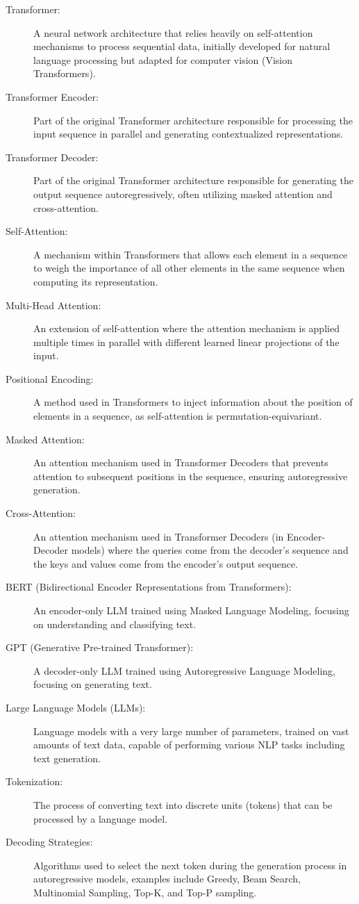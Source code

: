 \begin{description}
  \item[Transformer:] A neural network architecture that relies heavily on self-attention mechanisms to process sequential data, initially developed for natural language processing but adapted for computer vision (Vision Transformers).
  \item[Transformer Encoder:] Part of the original Transformer architecture responsible for processing the input sequence in parallel and generating contextualized representations.
  \item[Transformer Decoder:] Part of the original Transformer architecture responsible for generating the output sequence autoregressively, often utilizing masked attention and cross-attention.
  \item[Self-Attention:] A mechanism within Transformers that allows each element in a sequence to weigh the importance of all other elements in the same sequence when computing its representation.
  \item[Multi-Head Attention:] An extension of self-attention where the attention mechanism is applied multiple times in parallel with different learned linear projections of the input.
  \item[Positional Encoding:] A method used in Transformers to inject information about the position of elements in a sequence, as self-attention is permutation-equivariant.
  \item[Masked Attention:] An attention mechanism used in Transformer Decoders that prevents attention to subsequent positions in the sequence, ensuring autoregressive generation.
  \item[Cross-Attention:] An attention mechanism used in Transformer Decoders (in Encoder-Decoder models) where the queries come from the decoder's sequence and the keys and values come from the encoder's output sequence.
  \item[BERT (Bidirectional Encoder Representations from Transformers):] An encoder-only LLM trained using Masked Language Modeling, focusing on understanding and classifying text.
  \item[GPT (Generative Pre-trained Transformer):] A decoder-only LLM trained using Autoregressive Language Modeling, focusing on generating text.
  \item[Large Language Models (LLMs):] Language models with a very large number of parameters, trained on vast amounts of text data, capable of performing various NLP tasks including text generation.
  \item[Tokenization:] The process of converting text into discrete units (tokens) that can be processed by a language model.
  \item[Decoding Strategies:] Algorithms used to select the next token during the generation process in autoregressive models, examples include Greedy, Beam Search, Multinomial Sampling, Top-K, and Top-P sampling.
\end{description}

